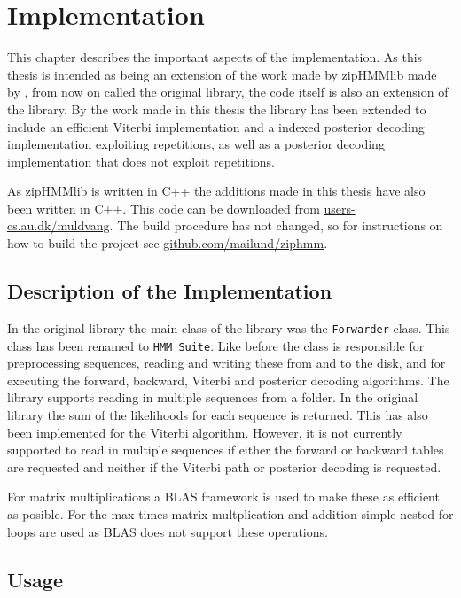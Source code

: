 
\chapter{Implementation}
\label{cha:implementation}

This chapter describes the important aspects of the implementation.  As this
thesis is intended as being an extension of the work made by zipHMMlib made by
\citet{sand2013ziphmmlib}, from now on called the original library, the code
itself is also an extension of the library.  By the work made in this thesis
the library has been extended to include an efficient Viterbi implementation
and a indexed posterior decoding implementation exploiting repetitions, as well
as a posterior decoding implementation that does not exploit repetitions.

As zipHMMlib is written in C++ the additions made in this thesis have also been
written in C++.  This code can be downloaded from
\url{users-cs.au.dk/muldvang}.   The build procedure has not
changed, so for instructions on how to build the project see
\url{github.com/mailund/ziphmm}.

\section{Description of the Implementation}

In the original library the main class of the library was the
\texttt{Forwarder} class.  This class has been renamed to \texttt{HMM\_Suite}.
Like before the class is responsible for preprocessing sequences, reading and
writing these from and to the disk, and for executing the forward, backward,
Viterbi and posterior decoding algorithms.  The library supports reading in
multiple sequences from a folder.  In the original library the sum of the
likelihoods for each sequence is returned.  This has also been implemented for
the Viterbi algorithm.  However, it is not currently supported to read in
multiple sequences if either the forward or backward tables are requested and
neither if the Viterbi path or posterior decoding is requested.

For matrix multiplications a BLAS framework is used to make these as efficient
as posible.  For the max times matrix multplication and addition simple nested
for loops are used as BLAS does not support these operations.

\section{Usage}

